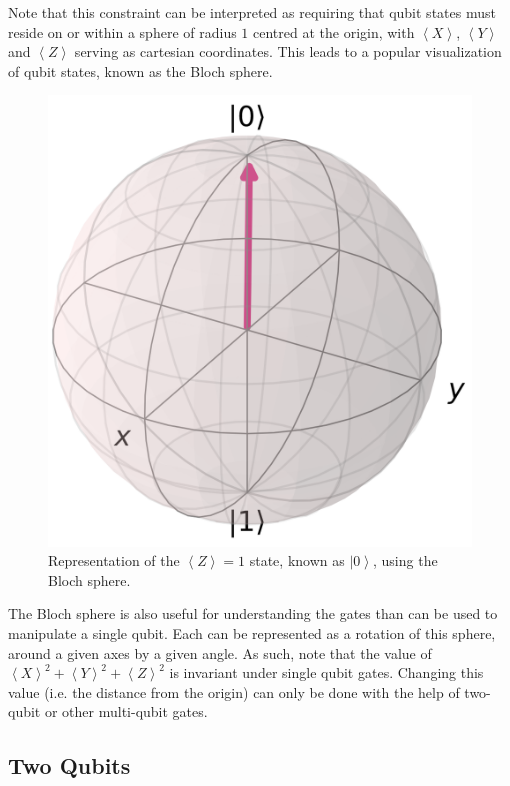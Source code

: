 \documentclass[conference]{IEEEtran}
\begin{document}
Note that this constraint can be interpreted as requiring that qubit states must reside on or within a sphere of radius $1$ centred at the origin, with $\left\langle X\right\rangle$, $\left\langle Y\right\rangle$ and $\left\langle Z\right\rangle$ serving as cartesian coordinates. This leads to a popular visualization of qubit states, known as the Bloch sphere.

\begin{figure}[htbp]
\begin{center}
\includegraphics[width=0.8\columnwidth]{figures/bloch.png}
\caption{Representation of the $\left\langle Z\right\rangle = 1$ state, known as $\left| 0 \right\rangle$, using the Bloch sphere. }
\label{bloch}
\end{center}
\end{figure}

The Bloch sphere is also useful for understanding the gates than can be used to manipulate a single qubit. Each can be represented as a rotation of this sphere, around a given axes by a given angle. As such, note that the value of $\left\langle X\right\rangle^2 + \left\langle Y\right\rangle^2 + \left\langle Z\right\rangle^2$ is invariant under single qubit gates. Changing this value (i.e. the distance from the origin) can only be done with the help of two-qubit or other multi-qubit gates.


\subsection{Two Qubits}
\end{document}
